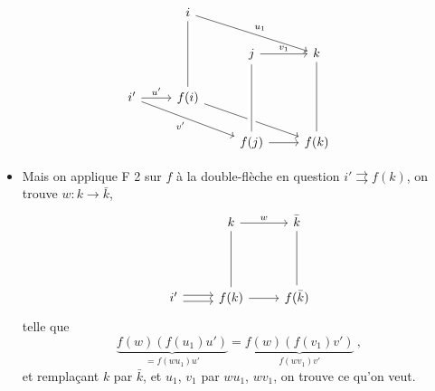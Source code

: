 
\[
\begin{tikzcd}
{} & i \arrow[drr, "u_1"] \arrow[dd, dash] & {} & {} \\
{} & {} & j \arrow[r, "v_1"] & k \arrow[dd, dash] \\
i' \arrow[r, "u'"] \arrow[drr, "v'"'] & f(i) \arrow[drr] & {} & {} \\
{} & {} & f(j) \arrow[r] \arrow[uu, dash, crossing over] & f(k)
\end{tikzcd}
\]

\begin{itemize}[label={}]
\item {}Mais on applique F 2 sur $f$ à la double-flèche en question $i' \rightrightarrows f(k)$, on trouve $w : k \longrightarrow \bar{k}$,
\[
\begin{tikzcd}
{} & k \arrow[r, "w"] \arrow[dd, dash] & \bar{k} \arrow[dd, dash] \\
{} & {} & {} \\
i' \arrow[r, shift left] \arrow[r, shift right] & f(k) \arrow[r] & f(\bar{k})
\end{tikzcd}
\]
telle que
\[
\underbrace{f(w)(f(u_1)u')}_{= f(wu_1)u'} = \underbrace{f(w)(f(v_1)v')}_{f(wv_1)v'} \ ,
\]
et remplaçant $k$ par $\bar{k}$, et $u_1$, $v_1$ par $wu_1$, $wv_1$, on trouve ce qu'on veut.
\end{itemize}

